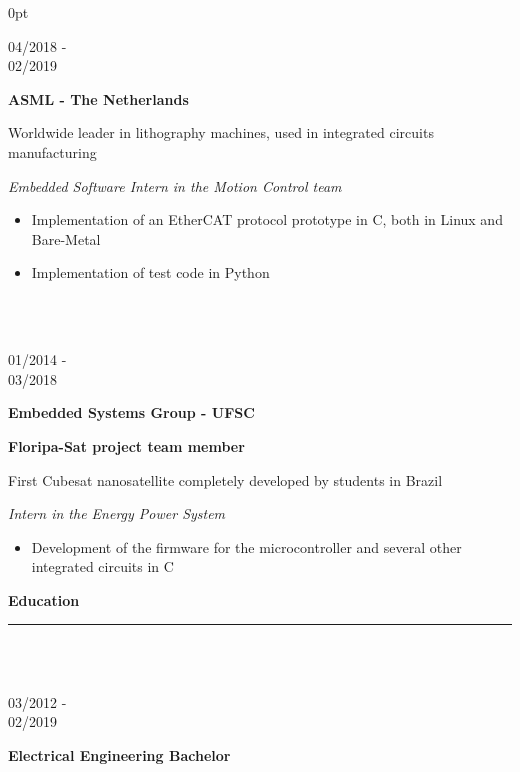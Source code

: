 \documentclass[a4paper]{article}
\begin{document}
\begin{adjustwidth}{\parindent}{0pt}
\begin{minipage}[t]{0.65\textwidth}
	\begin{minipage}[t]{0.2\textwidth}
	\large{04/2018 - \\ 02/2019}
	\end{minipage}
	\begin{minipage}[t]{0.8\textwidth}
	{
	  \setlength{\parskip}{5.5pt}
	  \Large{\textbf{ASML - The Netherlands}}
	  
	  \large{Worldwide leader in lithography machines, used in integrated circuits manufacturing}
	  
	  \large{\textit{Embedded Software Intern in the Motion Control team}}
	  \begin{itemize}
	    \item \normalsize{Implementation of an EtherCAT protocol prototype in C, both in Linux and Bare-Metal}
	    \item \normalsize{Implementation of test code in Python}
	  \end{itemize}
	}
\end{minipage} \\ \\

\begin{minipage}[t]{0.2\textwidth}
  \large{01/2014 - \\ 03/2018}
\end{minipage}
\begin{minipage}[t]{0.8\textwidth}
{
  \setlength{\parskip}{5.5pt}
  \Large{\textbf{Embedded Systems Group - UFSC}}
  
  \large{\textbf{Floripa-Sat project team member}}
  
  \large{First Cubesat nanosatellite completely developed by students in Brazil}
  
  \large{\textit{Intern in the Energy Power System}}
}
\begin{itemize}
  \item \normalsize{Development of the firmware for the microcontroller and several other integrated circuits in C}
\end{itemize}
  
\end{minipage}

\Large{\textbf{Education}} \normalsize \\ \rule{\textwidth}{0.5pt} \\ \\
\begin{minipage}[t]{0.2\textwidth}
\large{03/2012 - \\ 02/2019}
\end{minipage}
\begin{minipage}[t]{0.8\textwidth}
{
  \setlength{\parskip}{5.5pt}
  \Large{\textbf{Electrical Engineering Bachelor}}
  
}
\end{minipage}
\end{minipage}
\end{adjustwidth}
\end{document}
